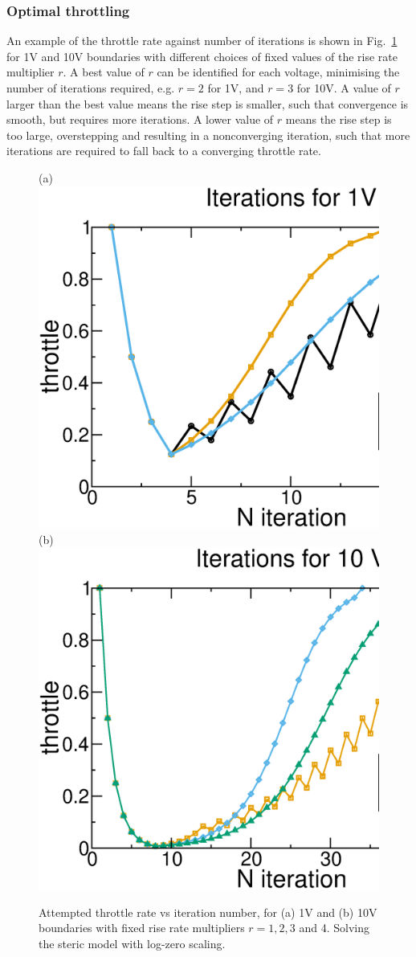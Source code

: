 \subsubsection{Optimal throttling}
An example of
the  throttle rate against number of iterations is shown in
Fig.~\ref{fig:throttle_rate} for 1V and 10V boundaries with different
choices of fixed values of the rise rate multiplier $r$. A best value of $r$ can be identified
for each voltage, minimising the number of iterations required,
e.g. $r=2$ for 1V, and $r=3$ for 10V. A
value of $r$ larger than the best value means the rise step is
smaller, such that convergence is smooth, but requires more
iterations. A lower value of $r$ means the rise step is too large,
overstepping and resulting in a nonconverging iteration, such that
more iterations are required to fall back to a converging throttle rate.

\begin{figure}
\centering
(a)
\includegraphics[width=0.45\linewidth]{test_1V.eps}
(b)
\includegraphics[width=0.45\linewidth]{test_10V.eps}
\caption{Attempted throttle rate vs iteration number, for (a) 1V and
  (b) 10V  boundaries with fixed rise rate multipliers $r=1,2,3$ and
  4. Solving the steric model with log-zero scaling.
}
\label{fig:throttle_rate}
\end{figure}

